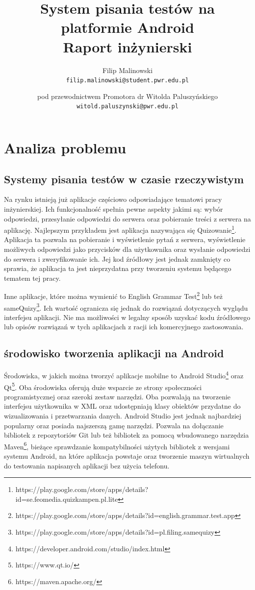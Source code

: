 \documentclass{report}
\title{%
	System pisania testów na platformie Android \\
	\large Raport inżynierski}
\author{
	Filip Malinowski\\
	\texttt{filip.malinowski@student.pwr.edu.pl}
	\and
	pod przewodnictwem Promotora dr Witolda Paluszyńskiego\\
	\texttt{witold.paluszynski@pwr.edu.pl}
}
\date{}
\begin{document}


	
	\chapter{Analiza problemu}
	
		\section{Systemy pisania testów w czasie rzeczywistym}
		Na rynku istnieją już aplikacje częściowo odpowiadające tematowi pracy inżynierskiej. Ich funkcjonalność spełnia 	pewne aspekty jakimi są: wybór odpowiedzi, przesyłanie odpowiedzi do serwera oraz pobieranie treści z serwera na aplikację. Najlepszym przykładem jest aplikacja nazywająca się Quizowanie\footnote{https://play.google.com/store/apps/details?id=se.feomedia.quizkampen.pl.lite}. Aplikacja ta pozwala na pobieranie i wyświetlenie pytań z serwera, wyświetlenie możliwych odpowiedzi jako przycisków dla użytkownika oraz wysłanie odpowiedzi do serwera i zweryfikowanie ich. Jej kod źródłowy jest jednak zamknięty co sprawia, że aplikacja ta jest nieprzydatna  przy tworzeniu systemu będącego tematem tej pracy.
	
		Inne aplikacje, które można wymienić to English Grammar Test\footnote{https://play.google.com/store/apps/details?id=english.grammar.test.app} lub też sameQuizy\footnote{https://play.google.com/store/apps/details?id=pl.filing.samequizy}. Ich wartość ogranicza się jednak do rozwiązań dotyczących wyglądu interfejsu aplikacji. Nie ma możliwości w legalny sposób uzyskać kodu źródłowego lub opisów rozwiązań w tych aplikacjach z racji ich komercyjnego zastosowania.
	
		\section{środowisko tworzenia aplikacji na Android}
		Środowiska, w jakich można tworzyć aplikacje mobilne to Android Studio\footnote{https://developer.android.com/studio/index.html} oraz Qt\footnote{https://www.qt.io/}. Oba środowiska oferują duże wsparcie ze strony społeczności programistycznej oraz szeroki zestaw narzędzi. Oba pozwalają na tworzenie interfejsu użytkownika w XML oraz udostępniają klasy obiektów przydatne do wizualizowania i przetwarzania danych. Android Studio jest jednak najbardziej popularny oraz posiada najszerszą gamę narzędzi. Pozwala na dołączanie bibliotek z repozytoriów Git lub też bibliotek za pomocą wbudowanego narzędzia Maven\footnote{https://maven.apache.org/}, bieżące sprawdzanie kompatybilności użytych bibliotek z wersjami systemu Android, na które aplikacja powstaje oraz tworzenie maszyn wirtualnych do testowania napisanych aplikacji bez użycia telefonu.
	
\end{document}
